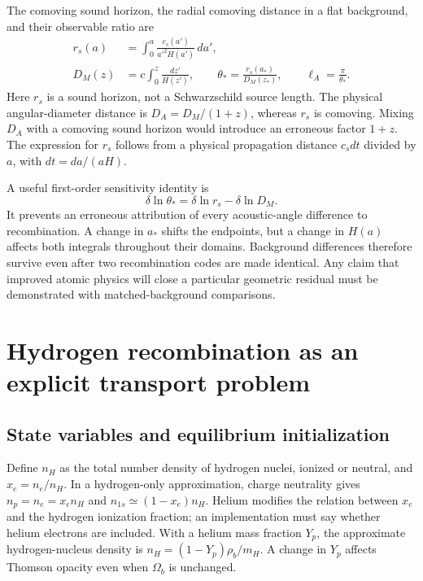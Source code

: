 The comoving sound horizon, the radial comoving distance in a flat background, and their observable ratio are
\begin{align}
 r_s(a)&=\int_0^a\frac{c_s(a')}{a'^2H(a')}\,da',\label{c9:rs}\\
 D_M(z)&=c\int_0^z\frac{dz'}{H(z')},\qquad
 \theta_* =\frac{r_s(a_*)}{D_M(z_*)},\qquad \ell_A=\frac{\pi}{\theta_*}.
 \label{c9:angle}
\end{align}
Here $r_s$ is a sound horizon, not a Schwarzschild source length. The physical angular-diameter distance is $D_A=D_M/(1+z)$, whereas $r_s$ is comoving. Mixing $D_A$ with a comoving sound horizon would introduce an erroneous factor $1+z$. The expression for $r_s$ follows from a physical propagation distance $c_sdt$ divided by $a$, with $dt=da/(aH)$.

A useful first-order sensitivity identity is
\begin{equation}
 \delta\ln\theta_* =\delta\ln r_s-\delta\ln D_M.
 \label{c9:sensitivity}
\end{equation}
It prevents an erroneous attribution of every acoustic-angle difference to recombination. A change in $a_*$ shifts the endpoints, but a change in $H(a)$ affects both integrals throughout their domains. Background differences therefore survive even after two recombination codes are made identical. Any claim that improved atomic physics will close a particular geometric residual must be demonstrated with matched-background comparisons.

\section{Hydrogen recombination as an explicit transport problem}
\subsection{State variables and equilibrium initialization}

Define $n_H$ as the total number density of hydrogen nuclei, ionized or neutral, and $x_e=n_e/n_H$. In a hydrogen-only approximation, charge neutrality gives $n_p=n_e=x_en_H$ and $n_{1s}\simeq(1-x_e)n_H$. Helium modifies the relation between $x_e$ and the hydrogen ionization fraction; an implementation must say whether helium electrons are included. With a helium mass fraction $Y_p$, the approximate hydrogen-nucleus density is $n_H=(1-Y_p)\rho_b/m_H$. A change in $Y_p$ affects Thomson opacity even when $\Omega_b$ is unchanged.

